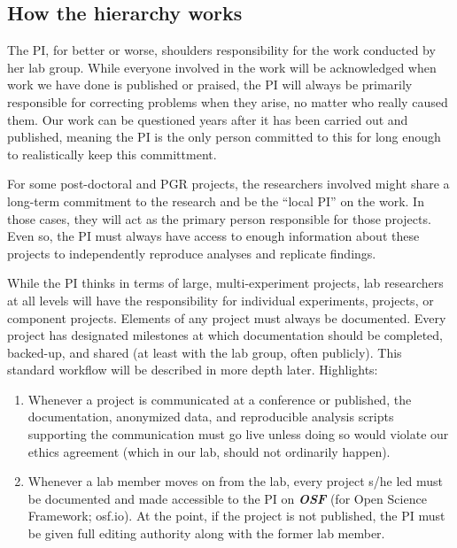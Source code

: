 \documentclass[12pt,]{book}
\theoremstyle{definition}
\theoremstyle{definition}
\theoremstyle{definition}
\theoremstyle{remark}
\begin{document}
\subsection{How the hierarchy works}\label{how-the-hierarchy-works}

The PI, for better or worse, shoulders responsibility for the work
conducted by her lab group. While everyone involved in the work will be
acknowledged when work we have done is published or praised, the PI will
always be primarily responsible for correcting problems when they arise,
no matter who really caused them. Our work can be questioned years after
it has been carried out and published, meaning the PI is the only person
committed to this for long enough to realistically keep this
committment.

For some post-doctoral and PGR projects, the researchers involved might
share a long-term commitment to the research and be the ``local PI'' on
the work. In those cases, they will act as the primary person
responsible for those projects. Even so, the PI must always have access
to enough information about these projects to independently reproduce
analyses and replicate findings.

While the PI thinks in terms of large, multi-experiment projects, lab
researchers at all levels will have the responsibility for individual
experiments, projects, or component projects. Elements of any project
must always be documented. Every project has designated milestones at
which documentation should be completed, backed-up, and shared (at least
with the lab group, often publicly). This standard workflow will be
described in more depth later. Highlights:

\begin{enumerate}
\def\labelenumi{\arabic{enumi}.}
\item
  Whenever a project is communicated at a conference or published, the
  documentation, anonymized data, and reproducible analysis scripts
  supporting the communication must go live unless doing so would
  violate our ethics agreement (which in our lab, should not ordinarily
  happen).
\item
  Whenever a lab member moves on from the lab, every project s/he led
  must be documented and made accessible to the PI on
  \textbf{\emph{OSF}} (for Open Science Framework; osf.io). At the
  point, if the project is not published, the PI must be given full
  editing authority along with the former lab member.
\end{enumerate}
\end{document}
